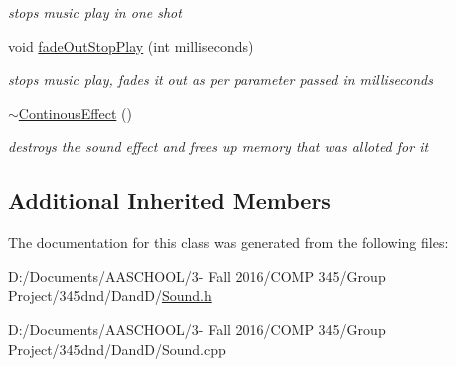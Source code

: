 \begin{DoxyCompactItemize}
\begin{DoxyCompactList}\small\item\em stops music play in one shot \end{DoxyCompactList}\item 
\hypertarget{class_continous_effect_a44fe8043bb8ff76b6a297c8cfd459769}{}\label{class_continous_effect_a44fe8043bb8ff76b6a297c8cfd459769} 
void \hyperlink{class_continous_effect_a44fe8043bb8ff76b6a297c8cfd459769}{fade\+Out\+Stop\+Play} (int milliseconds)
\begin{DoxyCompactList}\small\item\em stops music play, fades it out as per parameter passed in milliseconds \end{DoxyCompactList}\item 
\hypertarget{class_continous_effect_a93e5be42cbc8a76cd8032146464e6578}{}\label{class_continous_effect_a93e5be42cbc8a76cd8032146464e6578} 
\hyperlink{class_continous_effect_a93e5be42cbc8a76cd8032146464e6578}{$\sim$\+Continous\+Effect} ()
\begin{DoxyCompactList}\small\item\em destroys the sound effect and frees up memory that was alloted for it \end{DoxyCompactList}\end{DoxyCompactItemize}
\subsection*{Additional Inherited Members}


The documentation for this class was generated from the following files\+:\begin{DoxyCompactItemize}
\item 
D\+:/\+Documents/\+A\+A\+S\+C\+H\+O\+O\+L/3-\/ Fall 2016/\+C\+O\+M\+P 345/\+Group Project/345dnd/\+Dand\+D/\hyperlink{_sound_8h}{Sound.\+h}\item 
D\+:/\+Documents/\+A\+A\+S\+C\+H\+O\+O\+L/3-\/ Fall 2016/\+C\+O\+M\+P 345/\+Group Project/345dnd/\+Dand\+D/Sound.\+cpp\end{DoxyCompactItemize}

